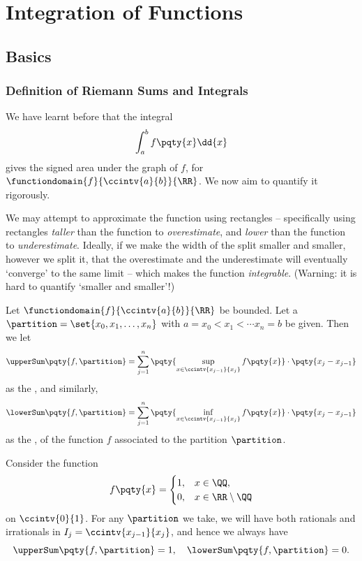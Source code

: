 \section{Integration of Functions}

\subsection{Basics}

\subsubsection{Definition of Riemann Sums and Integrals}

We have learnt before that the integral
\[
    \int_{a}^{b} f\pqty{x} \dd{x}
\]
gives the signed area under the graph of \(f\), for \(\functiondomain{f}{\ccintv{a}{b}}{\RR}\). We now aim to quantify it rigorously.

We may attempt to approximate the function using rectangles -- specifically using rectangles \emph{taller} than the function to \emph{overestimate}, and \emph{lower} than the function to \emph{underestimate}. Ideally, if we make the width of the split smaller and smaller, however we split it, that the overestimate and the underestimate will eventually `converge' to the same limit -- which makes the function \emph{integrable}. (Warning: it is hard to quantify `smaller and smaller'!)

\begin{definition}
    \label{def:upper-lower-riemann-sum}%
    Let \(\functiondomain{f}{\ccintv{a}{b}}{\RR}\) be bounded. Let a  \(\partition = \set{x_0, x_1, \ldots, x_n}\) with \(a = x_0 < x_1 < \cdots x_n = b\) be given. Then we let
    \[
        \upperSum \pqty{f, \partition} = \sum_{j = 1}^{n} \pqty{\sup_{x \in \ccintv{x_{j - 1}}{x_{j}}} f\pqty{x}} \cdot \pqty{x_j - x_{j - 1}}
    \]
    as the , and similarly,
    \[
        \lowerSum \pqty{f, \partition} = \sum_{j = 1}^{n} \pqty{\inf_{x \in \ccintv{x_{j - 1}}{x_{j}}} f\pqty{x}} \cdot \pqty{x_j - x_{j - 1}}
    \]
    as the , of the function \(f\) associated to the partition \(\partition\).
\end{definition}

\begin{example}
    \label{ex:riemann-sums}%
    Consider the function
    \[
        f\pqty{x} = \begin{cases}
            1, & x \in \QQ, \\
            0, & x \in \RR \setminus \QQ
        \end{cases}
    \]
    on \(\ccintv{0}{1}\). For any \(\partition\) we take, we will have both rationals and irrationals in \(I_j = \ccintv{x_{j - 1}}{x_j}\), and hence we always have
    \[
        \upperSum \pqty{f, \partition} = 1, \quad \lowerSum \pqty{f, \partition} = 0.
    \]
\end{example}

